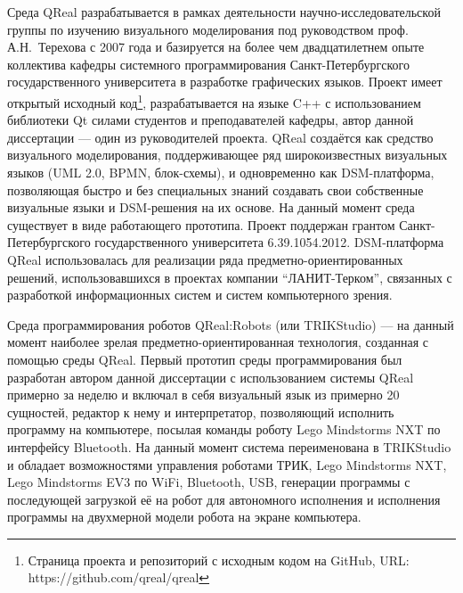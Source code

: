 Среда QReal разрабатывается в рамках деятельности научно-исследовательской 
группы по изучению визуального моделирования под руководством проф. 
А.Н.~Терехова с 2007 года и базируется на более чем двадцатилетнем опыте 
коллектива кафедры системного программирования Санкт-Петербургского 
государственного университета в разработке графических языков. 
Проект имеет открытый исходный код\footnote{Страница проекта и репозиторий с исходным кодом на GitHub, URL: https://github.com/qreal/qreal}, 
разрабатывается на языке C++ с использованием библиотеки Qt силами студентов и преподавателей кафедры, автор 
данной диссертации --- один из руководителей проекта. QReal создаётся как 
средство визуального моделирования, поддерживающее ряд широкоизвестных 
визуальных языков (UML 2.0, BPMN, блок-схемы), и одновременно как DSM-платформа, 
позволяющая быстро и без специальных знаний создавать свои собственные 
визуальные языки и DSM-решения на их основе. На данный момент среда существует 
в виде работающего прототипа. Проект поддержан грантом Санкт-Петербургского 
государственного университета 6.39.1054.2012. DSM-платформа QReal использовалась
 для реализации ряда предметно-ориентированных решений, использовавшихся в 
проектах компании "`ЛАНИТ-Терком"', связанных с разработкой информационных систем 
и систем компьютерного зрения.

Среда программирования роботов QReal:Robots (или TRIKStudio) --- на данный момент наиболее зрелая 
предметно-ориентированная технология, созданная с помощью среды QReal. 
Первый прототип среды программирования был разработан автором данной диссертации
с использованием системы QReal примерно за неделю и включал в себя визуальный 
язык из примерно 20 сущностей, редактор к нему и интерпретатор, позволяющий 
исполнить программу на компьютере, посылая команды роботу Lego Mindstorms NXT по интерфейсу 
Bluetooth. На данный момент система переименована в TRIKStudio и обладает возможностями управления роботами 
ТРИК, Lego Mindstorms NXT, Lego Mindstorms EV3 по WiFi, Bluetooth, USB, генерации программы с 
последующей загрузкой её на робот для автономного исполнения и исполнения 
программы на двухмерной модели робота на экране компьютера.

